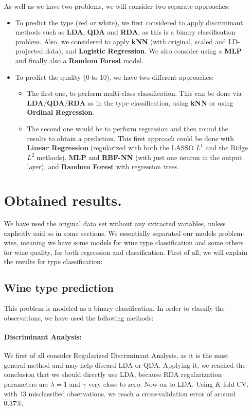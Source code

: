 \documentclass[10pt]{article}
\begin{document}
As well as we have two problems, we will consider two separate approaches:
\begin{itemize}
	\item To predict the type (red or white), we first considered to apply discriminant methods such as \textbf{LDA}, \textbf{QDA} and \textbf{RDA}, as this is a binary classification problem. Also, we considered to apply \textbf{kNN} (with original, scaled and LD-projected data), and \textbf{Logistic Regression}. We also consider using a \textbf{MLP} and finally also a \textbf{Random Forest} model.
	\item To predict the quality (0 to 10), we have two different approaches:
	\begin{itemize}
		\item The first one, to perform multi-class classification. This can be done via \textbf{LDA}/\textbf{QDA}/\textbf{RDA} as in the type classification, using \textbf{kNN} or using \textbf{Ordinal Regression}.
		\item The second one would be to perform regression and then round the results to obtain a prediction. This first approach could be done with \textbf{Linear Regression} (regularized with both the LASSO $L^1$ and the Ridge $L^2$ methods), \textbf{MLP} and \textbf{RBF-NN} (with just one neuron in the output layer), and \textbf{Random Forest} with regression trees.
	\end{itemize}		
\end{itemize}

\section{Obtained results.}

We have used the original data set without any extracted variables, unless explicitly said so in some sections. We essentially separated our models problem-wise, meaning we have some models for wine type classification and some others for wine quality, for both regression and classification. First of all, we will explain the results for type classification:
\subsection{Wine type prediction}

This problem is modeled as a binary classification. In order to classify the observations, we have used the following methods:
\paragraph{Discriminant Analysis:}
We first of all consider Regularized Discriminant Analysis, as it is the most general method and may help discard LDA or QDA. Applying it, we reached the conclusion that we should directly use LDA, because RDA regularization parameters are $\lambda=1$ and $\gamma$ very close to zero. Now on to LDA. Using $K$-fold CV, with 13 misclassified observations, we reach a cross-validation error of around 0.37\%.
\end{document}

